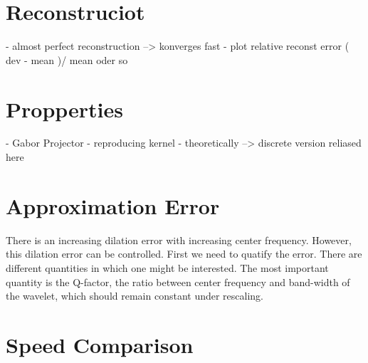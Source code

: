 \documentclass[journal]{IEEEtran}
\begin{document}
  \section{Reconstruciot}
  \label{sec:reconst}
 
- almost perfect reconstruction --> konverges fast
- plot relative reconst error ( dev - mean )/ mean  oder so




  \section{Propperties}
  \label{sec:propperties}
 
- Gabor Projector
- reproducing kernel
- theoretically --> discrete version reliased here




  \section{Approximation Error}
  \label{sec:error}

There is an increasing dilation error with increasing center frequency. However, this dilation error
can be controlled. First we need to quatify the error. There are different
quantities in which one might be interested. The most important quantity is the Q-factor, the ratio
between center frequency and band-width of the wavelet, which should remain constant under rescaling.






  \section{Speed Comparison}
  \label{sec:speed}


\end{document}
